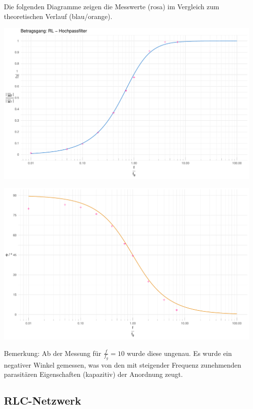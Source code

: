 \documentclass[a4paper, 12pt]{article}
\begin{document}
    \noindent Die folgenden Diagramme zeigen die Messwerte (rosa) im Vergleich zum theoretischen Verlauf (blau/orange).\\

    \begin{center}
      \includegraphics[scale=0.5]{./R/RL_HP/RL_HP.pdf}
    \end{center}

    \begin{center}
      \includegraphics[scale=0.5]{./R/RL_HP/RL_HP_phase.pdf}
    \end{center}

    Bemerkung: Ab der Messung für $\frac{f}{f_g} = 10$ wurde diese ungenau. Es wurde ein negativer Winkel gemessen, was von den mit steigender Frequenz zunehmenden parasitären Eigenschaften (kapazitiv) der Anordnung zeugt.

  \subsection{RLC-Netzwerk}
\end{document}
